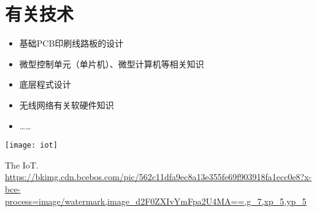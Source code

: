 \section{有关技术}
\begin{itemize}
	\item 基础PCB印刷线路板的设计
	\item 微型控制单元（单片机）、微型计算机等相关知识
	\item 底层程式设计
	\item 无线网络有关软硬件知识
	\item ……
\end{itemize}

\begin{marginfigure}[1.5cm]
	\texttt{[image: iot]}
	\caption[iot]{The IoT.\\ 
	\url{https://bkimg.cdn.bcebos.com/pic/562c11dfa9ec8a13e355fe69f903918fa1ecc0e8?x-bce-process=image/watermark,image_d2F0ZXIvYmFpa2U4MA==,g_7,xp_5,yp_5}}
\end{marginfigure}

